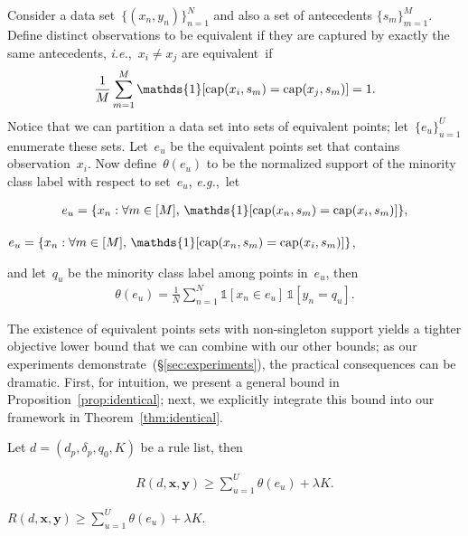 \documentclass[twoside,11pt]{article}
\def\ie{{\it i.e.},~}
\def\eg{{\it e.g.},~}
\def\one{\mathds{1}}
\newcommand{\x}{\mathbf{x}}
\newcommand{\y}{\mathbf{y}}
\def\RL{{d}}
\def\Prefix{d_p}
\def\Labels{\delta_p}
\def\Default{q_0}
\def\Obj{R}
\def\Reg{{\lambda}}
\def\Cap{\textnormal{cap}}
\def\one{\mathds{1}}
\newcommand{\nn}{\nonumber}
\begin{document}
Consider a data set~${\{(x_n, y_n)\}_{n=1}^N}$ and also a set of antecedents
${\{s_m\}_{m=1}^M}$.
%
Define distinct observations to be equivalent if they are captured by
exactly the same antecedents, \ie ${x_i \neq x_j}$ are equivalent~if
\begin{align}
\frac{1}{M} \sum_{m=1}^M \one [ \Cap(x_i, s_m) = \Cap(x_j, s_m) ] = 1. \nn
\end{align}
Notice that we can partition a data set into sets of equivalent points;
let~${\{e_u\}_{u=1}^U}$ enumerate these sets.
%
Let~$e_u$ be the equivalent points set that contains observation~$x_i$.
%
Now define~$\theta(e_u)$ to be the normalized support of the minority
class label with respect to set~$e_u$, \eg let
\begin{arxiv}
\begin{align}
{e_u = \{x_n : \forall m \in [M],\, \one [ \Cap(x_n, s_m) = \Cap(x_i, s_m) ] \}}, \nn
\end{align}
\end{arxiv}
\begin{kdd}
${e_u = \{x_n : \forall m \in [M],\, \one [ \Cap(x_n, s_m) = \Cap(x_i, s_m) ] \}}$,
\end{kdd}
and let~$q_u$ be the minority class label among points in~$e_u$, then
\begin{align}
\theta(e_u) = \frac{1}{N} \sum_{n=1}^N \one [ x_n \in e_u ]\, \one [ y_n = q_u ].
\label{eq:theta}
\end{align}

The existence of equivalent points sets with non-singleton support
yields a tighter objective lower bound that we can combine with our other bounds;
as our experiments demonstrate~(\S\ref{sec:experiments}),
the practical consequences can be dramatic.
%
First, for intuition, we present a general bound in
Proposition~\ref{prop:identical}; next, we explicitly integrate
this bound into our framework in Theorem~\ref{thm:identical}.

\begin{proposition}
\label{prop:identical}
Let ${\RL = (\Prefix, \Labels, \Default, K)}$ be a rule list, then
\begin{arxiv}
\begin{align}
\Obj(\RL, \x, \y) \ge \sum_{u=1}^U \theta(e_u) + \Reg K. \nn
\end{align}
\end{arxiv}
\begin{kdd}
${\Obj(\RL, \x, \y) \ge \sum_{u=1}^U \theta(e_u) + \Reg K}$.
\end{kdd}
\end{proposition}
\end{document}
